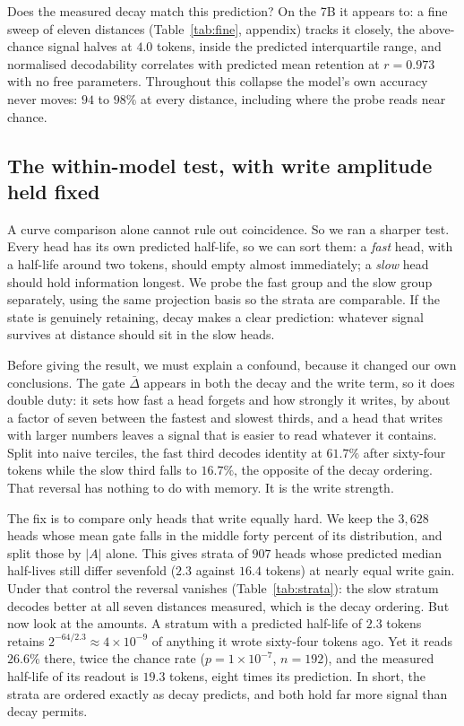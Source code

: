 Does the measured decay match this prediction? On the 7B it appears to: a fine
sweep of eleven distances (Table~\ref{tab:fine}, appendix) tracks it closely,
the above-chance signal halves at $4.0$ tokens, inside the predicted
interquartile range, and normalised decodability correlates with predicted
mean retention at $r = 0.973$ with no free parameters. Throughout this
collapse the model's own accuracy never moves: $94$ to $98\%$ at every
distance, including where the probe reads near chance.

\subsection{The within-model test, with write amplitude held fixed}
\label{sec:strata}

A curve comparison alone cannot rule out coincidence. So we ran a sharper
test. Every head has its own predicted half-life, so we can sort them: a
\emph{fast} head, with a half-life around two tokens, should empty almost
immediately; a \emph{slow} head should hold information longest. We probe the
fast group and the slow group separately, using the same projection basis so
the strata are comparable. If the state is genuinely retaining, decay makes a
clear prediction: whatever signal survives at distance should sit in the slow
heads.

Before giving the result, we must explain a confound, because it changed our
own conclusions. The gate $\bar{\Delta}$ appears in both the decay and the
write term, so it does double duty: it sets how fast a head forgets and how
strongly it writes, by about a factor of seven between the fastest and slowest
thirds, and a head that writes with larger numbers leaves a signal that is
easier to read whatever it contains. Split into naive terciles, the fast third
decodes identity at $61.7\%$ after sixty-four tokens while the slow third
falls to $16.7\%$, the opposite of the decay ordering. That reversal has
nothing to do with memory. It is the write strength.

The fix is to compare only heads that write equally hard. We keep the
$3{,}628$ heads whose mean gate falls in the middle forty percent of its
distribution, and split those by $|A|$ alone. This gives strata of $907$
heads whose predicted median half-lives still differ sevenfold ($2.3$ against
$16.4$ tokens) at nearly equal write gain. Under that control the reversal vanishes
(Table~\ref{tab:strata}): the slow stratum decodes better at all seven
distances measured, which is the decay ordering. But now look at the amounts.
A stratum with a predicted half-life of $2.3$ tokens retains
$2^{-64/2.3} \approx 4\times10^{-9}$ of anything it wrote sixty-four tokens
ago. Yet it reads $26.6\%$ there, twice the chance rate ($p = 1\times10^{-7}$,
$n = 192$), and the measured half-life of its readout is $19.3$ tokens, eight
times its prediction. In short, the strata are ordered exactly as decay
predicts, and both hold far more signal than decay permits.

